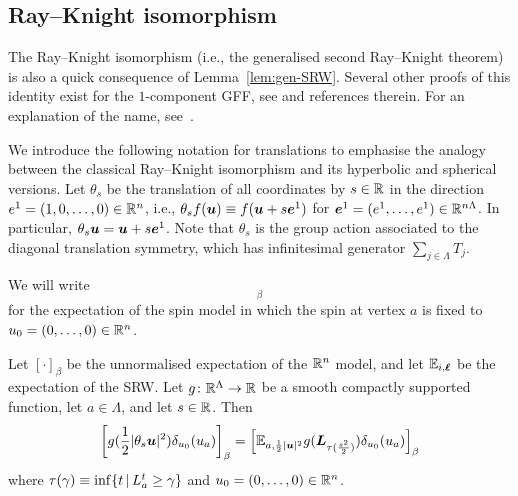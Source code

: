 \documentclass[11pt,a4paper]{article}
\begin{document}
\subsection{Ray--Knight isomorphism}
\label{sec:ray-knight-identity}

The Ray--Knight isomorphism (i.e., the generalised second Ray--Knight
theorem) is also a quick consequence of Lemma~\ref{lem:gen-SRW}.
Several other proofs of this identity exist for the $1$-component GFF,
see \cite{MR1813843,MR3520013} and references therein. 
For an explanation of the name, see~\cite[Remark~2.19]{MR2932978}.

We introduce the following notation for translations to emphasise the
analogy between the classical Ray--Knight isomorphism and its hyperbolic and
spherical versions.  Let $\theta_{s}$ be the translation of all
coordinates by $s\in \mathbb{R}$ in the direction
$e^{1} = (1,0,\dots, 0)\in \mathbb{R}^n$, i.e.,
$\theta_s f(\boldsymbol{u}) \equiv f(\boldsymbol{u}+s \boldsymbol{e}^1)$ for
$\boldsymbol{e}^1= (e^1, \dots, e^1) \in \mathbb{R}^{n\Lambda}$.  In particular,
$\theta_{s}\boldsymbol{u} = \boldsymbol{u} + s \boldsymbol{e}^{1}$. Note that
$\theta_{s}$ is the group action associated to the diagonal
translation symmetry, which has
infinitesimal generator $\sum_{j\in\Lambda}T_{j}$.

We will write
\begin{equation}
  [\delta_{u_0}(u_a)F]_\beta
\end{equation}
for the expectation of the spin model in which the spin at vertex $a$
is fixed to $u_0=(0,\dots, 0) \in \mathbb{R}^n$.


\begin{theorem}
  \label{thm:eucl-rk}
  Let $[\cdot]_\beta$ be the unnormalised expectation of the $\mathbb{R}^n$ model, and let $\mathbb{E}_{i,\boldsymbol{\ell}}$ be the expectation of the SRW.
  Let $g\colon\mathbb{R}^{\Lambda}\to\mathbb{R}$ be a smooth compactly supported function, let
  $a\in\Lambda$, and let $s\in\mathbb{R}$.  Then
  \begin{equation}
    \uspin{ g(\frac{1}{2}|\theta_s\V{u}|^2)\delta_{u_0}(u_a)}_\beta 
    = \uspin{  \E_{a,\frac{1}{2}|\V{u}|^2}g(\V{L}_{\tau(\frac{s^2}{2})})\delta_{u_0}(u_a)}_\beta
  \end{equation}
  where $\tau(\gamma) \equiv \inf \{t \,| \,L_a^t \ge \gamma\}$ and $u_0 = (0,\dots,0) \in \mathbb{R}^{n}$.
\end{theorem}
\end{document}
